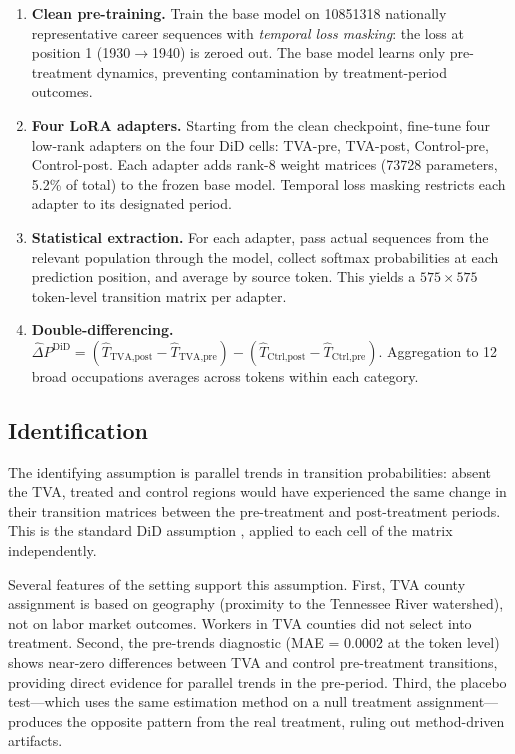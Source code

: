 \documentclass[12pt]{article}
\begin{document}
\begin{enumerate}
    \item \textbf{Clean pre-training.} Train the base model on \num{10851318} nationally representative career sequences with \textit{temporal loss masking}: the loss at position 1 (1930$\to$1940) is zeroed out. The base model learns only pre-treatment dynamics, preventing contamination by treatment-period outcomes.
    \item \textbf{Four LoRA adapters.} Starting from the clean checkpoint, fine-tune four low-rank adapters on the four DiD cells: TVA-pre, TVA-post, Control-pre, Control-post. Each adapter adds rank-8 weight matrices (\num{73728} parameters, 5.2\% of total) to the frozen base model. Temporal loss masking restricts each adapter to its designated period.
    \item \textbf{Statistical extraction.} For each adapter, pass actual sequences from the relevant population through the model, collect softmax probabilities at each prediction position, and average by source token. This yields a $575 \times 575$ token-level transition matrix per adapter.
    \item \textbf{Double-differencing.} $\hat{\Delta} P^{\text{DiD}} = (\hat{T}_{\text{TVA,post}} - \hat{T}_{\text{TVA,pre}}) - (\hat{T}_{\text{Ctrl,post}} - \hat{T}_{\text{Ctrl,pre}})$. Aggregation to 12 broad occupations averages across tokens within each category.
\end{enumerate}

\subsection{Identification}

The identifying assumption is parallel trends in transition probabilities: absent the TVA, treated and control regions would have experienced the same change in their transition matrices between the pre-treatment and post-treatment periods. This is the standard DiD assumption \citep{roth2023}, applied to each cell of the matrix independently.

Several features of the setting support this assumption. First, TVA county assignment is based on geography (proximity to the Tennessee River watershed), not on labor market outcomes. Workers in TVA counties did not select into treatment. Second, the pre-trends diagnostic (MAE = 0.0002 at the token level) shows near-zero differences between TVA and control pre-treatment transitions, providing direct evidence for parallel trends in the pre-period. Third, the placebo test---which uses the same estimation method on a null treatment assignment---produces the opposite pattern from the real treatment, ruling out method-driven artifacts.
\end{document}
